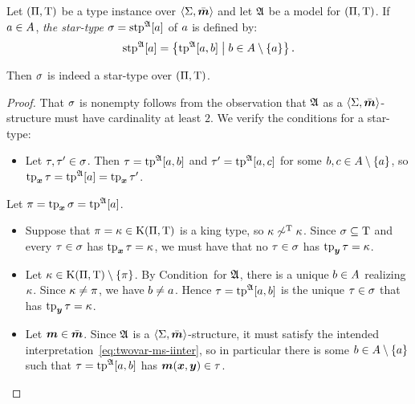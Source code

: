 \begin{definition}\label{def:stp-str}
Let $(\Pi,\mathrm{T})$ be a type instance over $\left\langle \mathrm{\Sigma},\bar{\bm{m}} \right\rangle$
and let $\mathfrak{A}$ be a model for $(\Pi,\mathrm{T})$.
If $a \in A$, \emph{the star-type} $\sigma = \operatorname{stp}^{\mathfrak{A}}[a]$ of $a$ is
defined by:
\[
  \operatorname{stp}^{\mathfrak{A}}[a] = \left\{\operatorname{tp}^{\mathfrak{A}}[a,b]\mathrel{}\middle|\mathrel{}b \in A \setminus \left\{a\right\}\right\}.
\]
\end{definition}
\begin{remark}\label{rem:stp-str}
Then $\sigma$ is indeed a star-type over $(\Pi,\mathrm{T})$.
\end{remark}
\begin{proof}
That $\sigma$ is nonempty follows from the observation that $\mathfrak{A}$ as a
$\left\langle \mathrm{\Sigma},\bar{\bm{m}} \right\rangle$-structure must have cardinality at least $2$.
We verify the conditions for a star-type:
\begin{itemize}
  \item[\refcondstpx]
  Let $\tau,{\tau'} \in \sigma$. 
  Then $\tau = \operatorname{tp}^{\mathfrak{A}}[a,b]$ and ${\tau'} = \operatorname{tp}^{\mathfrak{A}}[a,c]$ for some
  $b,c \in A \setminus \left\{a\right\}$, so $\operatorname{tp}_{\bm{x}}\tau = \operatorname{tp}^{\mathfrak{A}}[a] =
  \operatorname{tp}_{\bm{x}}{\tau'}$.
\end{itemize}
  Let $\pi = \operatorname{tp}_{\bm{x}}\sigma = \operatorname{tp}^{\mathfrak{A}}[a]$.
\begin{itemize}[resume]
  \item[\refcondstpkx]
  Suppose that $\pi = \kappa \in \mathrm{K}(\Pi,\mathrm{T})$ is a king type,
  so $\kappa \not\sim^{\mathrm{T}} \kappa$. Since $\sigma \subseteq \mathrm{T}$ and every
  $\tau \in \sigma$ has $\operatorname{tp}_{\bm{x}}\tau = \kappa$, we must have that no 
  $\tau \in \sigma$ has $\operatorname{tp}_{\bm{y}}\tau = \kappa$.
  \item[\refcondstpky]
  Let $\kappa \in \mathrm{K}(\Pi,\mathrm{T}) \setminus \left\{\pi\right\}$. By
  Condition~ for $\mathfrak{A}$, there is a unique $b \in A$
  realizing $\kappa$. Since $\kappa \neq \pi$, we have $b \neq a$.
  Hence $\tau = \operatorname{tp}^{\mathfrak{A}}[a,b]$ is the unique $\tau \in \sigma$ that has
  $\operatorname{tp}_{\bm{y}}\tau = \kappa$.
  \item[\refcondstpm]
  Let $\bm{m} \in \bar{\bm{m}}$. Since $\mathfrak{A}$ is a $\left\langle \mathrm{\Sigma},\bar{\bm{m}} \right\rangle$-structure, it must
  satisfy the intended interpretation~\cref{eq:twovar-ms-iinter}, so in
  particular there is some $b \in A \setminus \left\{a\right\}$ such that $\tau =
  \operatorname{tp}^{\mathfrak{A}}[a,b]$ has $\bm{m}(\bm{x},\bm{y}) \in \tau$.
\end{itemize}
\end{proof}

